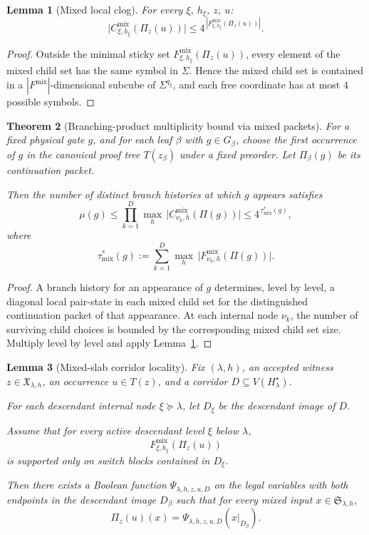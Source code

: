 \documentclass[11pt]{article}
\newtheorem{theorem}{Theorem}[section]
\newtheorem{lemma}[theorem]{Lemma}
\begin{document}
\begin{lemma}[Mixed local clog]
\label{lem:mixed-local-clog}
For every $\xi$, $h_\xi$, $z$, $u$:
\[
\bigl|C_{\xi,h_\xi}^{\mathrm{mix}}(\Pi_z(u))\bigr|
\le 4^{\,|F_{\xi,h_\xi}^{\mathrm{mix}}(\Pi_z(u))|}.
\]
\end{lemma}

\begin{proof}
Outside the minimal sticky set
$F_{\xi,h_\xi}^{\mathrm{mix}}(\Pi_z(u))$, every element of the mixed child
set has the same symbol in $\Sigma$.  Hence the mixed child set is contained
in a $|F^{\mathrm{mix}}|$-dimensional subcube of $\Sigma^{q_\xi}$, and each
free coordinate has at most $4$ possible symbols.
\end{proof}

\begin{theorem}[Branching-product multiplicity bound via mixed packets]
\label{thm:branching-product-mixed}
For a fixed physical gate $g$, and for each leaf $\beta$ with
$g\in G_\beta$, choose the first occurrence of $g$ in the canonical proof
tree $T(z_\beta)$ under a fixed preorder.  Let $\Pi_\beta(g)$ be its
continuation packet.

Then the number of distinct branch histories at which $g$ appears satisfies
\[
\mu(g)
\le\prod_{k=1}^{D}\max_{h}\,
\bigl|C_{\nu_k,h}^{\mathrm{mix}}(\Pi(g))\bigr|
\le 4^{\,\tau_{\mathrm{mix}}^*(g)},
\]
where
\[
\tau_{\mathrm{mix}}^*(g)
:=\sum_{k=1}^{D}\max_{h}\,
\bigl|F_{\nu_k,h}^{\mathrm{mix}}(\Pi(g))\bigr|.
\]
\end{theorem}

\begin{proof}
A branch history for an appearance of $g$ determines, level by level, a
diagonal local pair-state in each mixed child set for the distinguished
continuation packet of that appearance.  At each internal node $\nu_k$,
the number of surviving child choices is bounded by the corresponding
mixed child set size.  Multiply level by level and apply
Lemma~\ref{lem:mixed-local-clog}.
\end{proof}

\begin{lemma}[Mixed-slab corridor locality]
\label{lem:mixed-slab-corridor-locality}
Fix $(\lambda,h)$, an accepted witness $z\in\mathfrak{X}_{\lambda,h}$, an
occurrence $u\in T(z)$, and a corridor
$D\subseteq V(H_\lambda^\star)$.

For each descendant internal node $\xi\succeq\lambda$, let $D_\xi$ be the
descendant image of $D$.

Assume that for every active descendant level $\xi$ below $\lambda$,
\[
F_{\xi,h_\xi}^{\mathrm{mix}}(\Pi_z(u))
\]
is supported only on switch blocks contained in $D_\xi$.

Then there exists a Boolean function $\Psi_{\lambda,h,z,u,D}$ on the legal
variables with both endpoints in the descendant image $D_\beta$ such that
for every mixed input $x\in\mathfrak{S}_{\lambda,h}$,
\[
\Pi_z(u)(x)=\Psi_{\lambda,h,z,u,D}(x|_{D_\beta}).
\]
\end{lemma}
\end{document}
